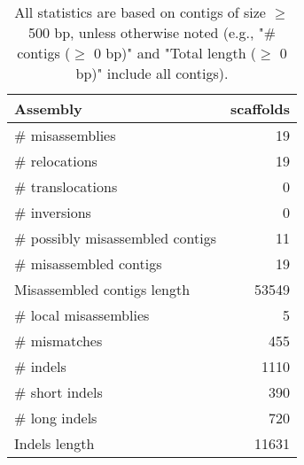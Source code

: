 \documentclass[12pt,a4paper]{article}
\begin{document}
\begin{table}[ht]
\begin{center}
\caption{All statistics are based on contigs of size $\geq$ 500 bp, unless otherwise noted (e.g., "\# contigs ($\geq$ 0 bp)" and "Total length ($\geq$ 0 bp)" include all contigs).}
\begin{tabular}{|l*{1}{|r}|}
\hline
Assembly & scaffolds \\ \hline
\# misassemblies & 19 \\ \hline
\hspace{5mm}\# relocations & 19 \\ \hline
\hspace{5mm}\# translocations & 0 \\ \hline
\hspace{5mm}\# inversions & 0 \\ \hline
\# possibly misassembled contigs & 11 \\ \hline
\# misassembled contigs & 19 \\ \hline
Misassembled contigs length & 53549 \\ \hline
\# local misassemblies & 5 \\ \hline
\# mismatches & 455 \\ \hline
\# indels & 1110 \\ \hline
\hspace{5mm}\# short indels & 390 \\ \hline
\hspace{5mm}\# long indels & 720 \\ \hline
Indels length & 11631 \\ \hline
\end{tabular}
\end{center}
\end{table}
\end{document}
